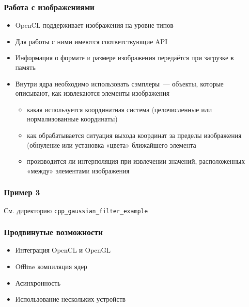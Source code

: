 \documentclass[
    aspectratio=169,
]{beamer}
\begin{document}
\begin{frame}
    \frametitle{Работа с изображениями}

    \begin{itemize}
        \item OpenCL поддерживает изображения на уровне типов
        \item Для работы с ними имеются соответствующие API
        \item Информация о формате и размере изображения передаётся при загрузке в память
        \item Внутри ядра необходимо использовать сэмплеры~--- объекты, которые описывают, как извлекаются элементы изображения
              \begin{itemize}
                  \item какая используется координатная система (целочисленные или нормализованные координаты)
                  \item как обрабатывается ситуация выхода координат за пределы изображения (обнуление или установка «цвета» ближайшего элемента
                  \item производится ли интерполяция при извлечении значений, расположенных «между» элементами изображения
              \end{itemize}
    \end{itemize}

\end{frame}

\begin{frame}
    \frametitle{Пример 3}

    См. директорию \texttt{cpp\_gaussian\_filter\_example}

\end{frame}

\begin{frame}
    \frametitle{Продвинутые возможности}

    \begin{itemize}
        \item Интеграция OpenCL и OpenGL
        \item Offline компиляция ядер
        \item Асинхронность
        \item Использование нескольких устройств
    \end{itemize}

\end{frame}

\end{document}
